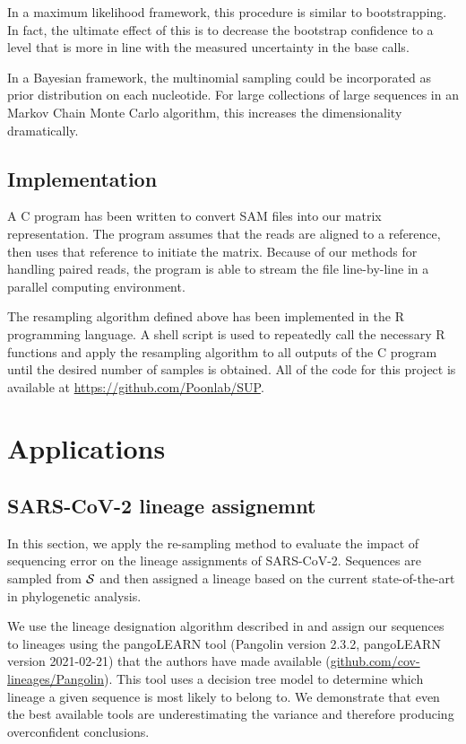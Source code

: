 \documentclass[10pt]{article}
\begin{document}
In a maximum likelihood framework, this procedure is similar to bootstrapping.
In fact, the ultimate effect of this is to decrease the bootstrap confidence to a level that is more in line with the measured uncertainty in the base calls.

In a Bayesian framework, the multinomial sampling could be incorporated as prior distribution on each nucleotide.
For large collections of large sequences in an Markov Chain Monte Carlo algorithm, this increases the dimensionality dramatically.

\subsection{Implementation}

A C program has been written to convert SAM files into our matrix representation. The program assumes that the reads are aligned to a reference, then uses that reference to initiate the matrix. Because of our methods for handling paired reads, the program is able to stream the file line-by-line in a parallel computing environment. 

The resampling algorithm defined above has been implemented in the R programming language. A shell script is used to repeatedly call the necessary R functions and apply the resampling algorithm to all outputs of the C program until the desired number of samples is obtained. All of the code for this project is available at \url{https://github.com/Poonlab/SUP}.

\section{Applications}

\subsection{SARS-CoV-2 lineage assignemnt}

In this section, we apply the re-sampling method to evaluate the impact of sequencing error on the lineage assignments of SARS-CoV-2.
Sequences are sampled from $\mathcal{S}$ and then assigned a lineage based on the current state-of-the-art in phylogenetic analysis.

We use the lineage designation algorithm described in \citet{rambautDynamicNomenclatureProposal2020} and assign our sequences to lineages using the pangoLEARN tool (Pangolin version 2.3.2, pangoLEARN version 2021-02-21) that the authors have made available (\url{github.com/cov-lineages/Pangolin}).
This tool uses a decision tree model to determine which lineage a given sequence is most likely to belong to.
We demonstrate that even the best available tools are underestimating the variance and therefore producing overconfident conclusions.
\end{document}
